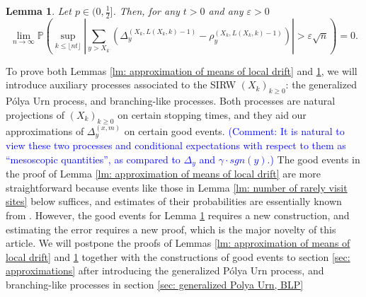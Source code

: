 \documentclass[twoside,12pt, a4paper]{article}
\newtheorem{lemma}{Lemma}[section]
\numberwithin{equation}{section}
\theoremstyle{remark}
\newcommand{\abs}[1]{\left\vert #1 \right\vert}
\newcommand{\edt}[1]{\textcolor{red}{#1}} %
\newcommand{\comment}[1]{\textcolor{blue}{(Comment: #1)}}
\begin{document}
	\begin{lemma}\label{lm: approx local drift by conditional means}
		Let $p\in (0,\frac{1}{2}]$. Then, for any $t>0$ and any $\varepsilon >0$
		\begin{equation}\label{eq: control of martingale difference for local drift}
			\lim_{n \to \infty }\mathbb{P}\left(\sup_{k\leq\lfloor nt \rfloor} \abs{\sum_{y> X_k} \left(\Delta_{y}^{(X_k,L(X_k,k)-1)}- \rho_{y}^{(X_k,L(X_k,k)-1)} \right)   }  > \varepsilon \sqrt{n}  \right) =0. 
		\end{equation}
	\end{lemma}
	
	
	
	To prove both Lemmas \ref{lm: approximation of means of local drift} and \ref{lm: approx local drift by conditional means}, we will introduce auxiliary processes associated to the SIRW $(X_k)_{k\geq 0}$: the generalized P\'{o}lya Urn process, and branching-like processes. Both processes are natural projections of $(X_k)_{k\geq 0}$ on certain stopping times, and they aid our approximations of $\Delta_{y}^{(x,m)}$ on certain good events. 
	\comment{It is natural to view these two processes and conditional expectations with respect to them as ``mesoscopic quantities'', as compared to $\Delta_y$ and $\gamma\cdot sgn(y)$.}
	The good events in the proof of Lemma \ref{lm: approximation of means of local drift} are more straightforward because events like those in Lemma \ref{lm: number of rarely visit sites} below suffices, and estimates of their probabilities are essentially known from \cite{KMP23}. However, the good events for Lemma \ref{lm: approx local drift by conditional means} requires a new construction, and estimating the error requires a new proof, which is the major novelty of this article. We will postpone the proofs of Lemmas \ref{lm: approximation of means of local drift} and \ref{lm: approx local drift by conditional means} together with the constructions of good events to section \ref{sec: approximations} after introducing the generalized P\'{o}lya Urn process, and branching-like processes in section \ref{sec: generalized Polya Urn, BLP}
\end{document}

